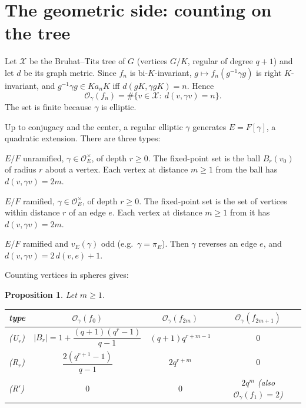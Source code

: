 \documentclass[11pt]{article}
\newtheorem{proposition}{Proposition}
\theoremstyle{remark}
\newcommand{\OO}{\mathcal{O}}
\begin{document}
\section{The geometric side: counting on the tree}

Let $\mathcal{X}$ be the Bruhat--Tits tree of $G$ (vertices $G/K$, regular of degree $q+1$) and let $d$ be its graph metric. Since $f_n$ is bi-$K$-invariant, $g\mapsto f_n(g^{-1}\gamma g)$ is right $K$-invariant, and $g^{-1}\gamma g\in Ka_nK$ iff $d(gK,\gamma gK)=n$. Hence
\begin{equation}\label{eq:count}
\OO_\gamma(f_n)=\#\{v\in\mathcal{X}:\ d(v,\gamma v)=n\}.
\end{equation}
The set is finite because $\gamma$ is elliptic.

Up to conjugacy and the center, a regular elliptic $\gamma$ generates $E=F[\gamma]$, a quadratic extension. There are three types:
\begin{description}[leftmargin=1.2em]
\item[(U$_r$)] $E/F$ unramified, $\gamma\in\OO_E^\times$, of depth $r\ge0$. The fixed-point set is the ball $B_r(v_0)$ of radius $r$ about a vertex. Each vertex at distance $m\ge1$ from the ball has $d(v,\gamma v)=2m$.
\item[(R$_r$)] $E/F$ ramified, $\gamma\in\OO_E^\times$, of depth $r\ge0$. The fixed-point set is the set of vertices within distance $r$ of an edge $e$. Each vertex at distance $m\ge1$ from it has $d(v,\gamma v)=2m$.
\item[(R$'$)] $E/F$ ramified and $v_E(\gamma)$ odd (e.g.\ $\gamma=\pi_E$). Then $\gamma$ reverses an edge $e$, and $d(v,\gamma v)=2\,d(v,e)+1$.
\end{description}
Counting vertices in spheres gives:
\begin{proposition}\label{prop:geom}
Let $m\ge1$.
\begin{center}
\begin{tabular}{lccc}
\toprule
type & $\OO_\gamma(f_0)$ & $\OO_\gamma(f_{2m})$ & $\OO_\gamma(f_{2m+1})$ \\
\midrule
(U$_r$) & $|B_r|=1+\dfrac{(q+1)(q^r-1)}{q-1}$ & $(q+1)q^{r+m-1}$ & $0$\\[2ex]
(R$_r$) & $\dfrac{2(q^{r+1}-1)}{q-1}$ & $2q^{r+m}$ & $0$\\[2ex]
(R$'$) & $0$ & $0$ & $2q^{m}$ \quad (also $\OO_\gamma(f_1)=2$)\\
\bottomrule
\end{tabular}
\end{center}
\end{proposition}
\end{document}
